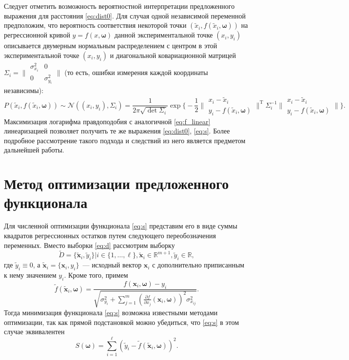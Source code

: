 \documentclass[tikz,10pt,a4paper]{article}
\newcommand{\bomega}{\boldsymbol{\omega}}
\begin{document}
Следует отметить возможность вероятностной интерпретации предложенного
выражения для расстояния \eqref{eq:dist0}.
Для случая одной независимой переменной предположим, что
вероятность соответствия некоторой точки $(\tilde{x}_i, f(\tilde{x}_i, \bomega))$
на регрессионной кривой $y = f(x, \bomega)$
данной экспериментальной точке $(x_i, y_i)$
описывается двумерным нормальным распределением
с центром в этой экспериментальной точке $(x_i, y_i)$
и диагональной ковариационной матрицей
$\Sigma_i = \big\| \begin{smallmatrix} \sigma_{x_i}^2 & 0 \\ 0 & \sigma_{y_i}^2 \end{smallmatrix} \big\|$
(то есть, ошибки измерения каждой координаты независимы):
\[
  P(\tilde{x}_i, f(\tilde{x}_i, \bomega)) \sim \mathcal{N}((x_i, y_i), \Sigma_i)
	= \frac{1}{2 \pi \sqrt{\det \Sigma_i}}
			\exp \Big\{ -\frac{1}{2}
						\Big\|\begin{matrix} x_i - \tilde{x}_i \\ y_i - f(\tilde{x}_i, \bomega) \end{matrix}\Big\|^\mathrm{T}
						\Sigma_i^{-1}
						\Big\|\begin{matrix} x_i - \tilde{x}_i \\ y_i - f(\tilde{x}_i, \bomega) \end{matrix}\Big\|
				 \Big\}.
\]
Максимизация логарифма правдоподобия
с аналогичной \eqref{eq:f_linear} линеаризацией
позволяет получить те же выражения \eqref{eq:dist0}, \eqref{eq:s}.
Более подробное рассмотрение такого подхода
и следствий из него является предметом дальнейшей работы.

\section{Метод оптимизации предложенного функционала}

Для численной оптимизации функционала \eqref{eq:s} представим его в виде
суммы квадратов регрессионных остатков путем следующего переобозначения переменных.
Вместо выборки \eqref{eq:d}
рассмотрим выборку
\[
  \tilde{D} = \{ \tilde{\mathbf{x}}_i, \tilde{y}_i \} | i \in \{ 1, \dots, \ell \}, \tilde{\mathbf{x}}_i \in \mathbb{R}^{m + 1}, \tilde{y}_i \in \mathbb{R},
\]
где $\tilde{y}_i \equiv 0$, а
$\tilde{\mathbf{x}}_i = \{ \mathbf{x}_i, y_i \}$~--- исходный вектор $\mathbf{x}_i$
с дополнительно приписанным к нему значением $y_i$. Кроме того, примем
\[
  \tilde{f}(\tilde{\mathbf{x}}_i, \bomega) = \frac{f(\mathbf{x}_i, \bomega) - y_i}{\sqrt{\sigma_{y_i}^2 + \sum_{j = 1}^m (\frac{\partial f}{\partial x_j}(\mathbf{x}_i, \bomega))^2 \sigma^2_{x_{ij}}}}.
\]
Тогда минимизация функционала \eqref{eq:s} возможна известными методами оптимизации, так
как прямой подстановкой можно убедиться, что \eqref{eq:s} в этом случае эквивалентен
\[
  S(\bomega) = \sum_{i = 1}^\ell (\tilde{y}_i - \tilde{f}(\tilde{\mathbf{x}}_i, \bomega))^2.
\]
\end{document}
